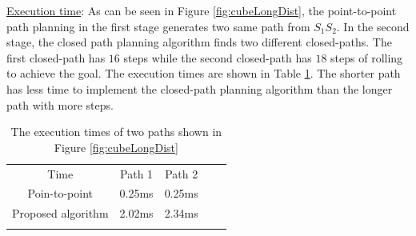 
\noindent \uline{Execution time}:
As can be seen in Figure \ref{fig:cubeLongDist}, the point-to-point path planning in the first stage generates two same path from $S_1S_2$. In the second stage, the closed path planning algorithm finds two different closed-paths. The first closed-path has $16$ steps while the second closed-path has $18$ steps of rolling to achieve the goal.
The execution times are shown in Table \ref{tab:timeCubeExtension}. The shorter path has less time to implement the closed-path planning algorithm than the longer path with more steps.\\

\begin{table}[H]
\caption{The execution times of two paths shown in Figure \ref{fig:cubeLongDist}}
\centering
\begin{tabular}{cccll}
\cline{1-3}
\multicolumn{1}{|c|}{Time}          & \multicolumn{1}{c|}{Path 1} & \multicolumn{1}{c|}{Path 2} &  &  \\ \cline{1-3}
\multicolumn{1}{|c|}{Poin-to-point} & \multicolumn{1}{c|}{0.25ms}    & \multicolumn{1}{c|}{0.25ms}    &  &  \\ \cline{1-3}
\multicolumn{1}{|c|}{Proposed algorithm} & \multicolumn{1}{c|}{2.02ms} & \multicolumn{1}{c|}{2.34ms} &  &  \\ \cline{1-3}
\multicolumn{1}{l}{}                & \multicolumn{1}{l}{}        & \multicolumn{1}{l}{}        &  & 
\end{tabular}
\label{tab:timeCubeExtension}
\end{table}

